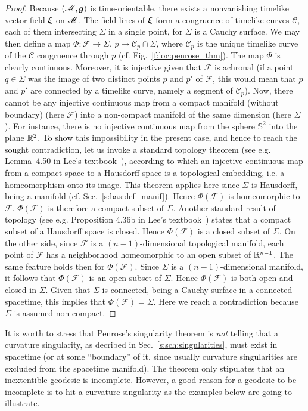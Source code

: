 \begin{proof}
Because $(\mathscr{M},\bm{g})$ is time-orientable, there exists a nonvanishing
timelike vector field $\bm{\xi}$ on $\mathscr{M}$. The field lines of $\bm{\xi}$
form a congruence of timelike curves $\mathscr{C}$, each of them intersecting
$\Sigma$ in a single point, for $\Sigma$ is a Cauchy surface.
We may then define a map $\Phi: \mathscr{F} \to \Sigma$,
$p \mapsto \mathscr{C}_p \cap \Sigma$, where $\mathscr{C}_p$ is the unique
timelike curve of the $\mathscr{C}$ congruence through $p$ (cf. Fig.~\ref{f:loc:penrose_thm}).
The map $\Phi$ is clearly continuous. Moreover, it is injective given that
$\mathscr{F}$ is achronal (if a point $q\in\Sigma$ was the image of two distinct
points $p$ and $p'$ of $\mathscr{F}$, this would mean that $p$ and $p'$
are connected by a timelike curve, namely a segment of $\mathscr{C}_p$).
Now, there cannot be any injective continuous map from a
compact manifold (without boundary) (here $\mathscr{F}$)
into a non-compact manifold of the same dimension (here $\Sigma$). For instance,
there is no injective continuous map from the sphere $\mathbb{S}^2$ into
the plane $\mathbb{R}^2$. To show this impossibility in the present case, and hence
to reach the sought contradiction, let us invoke a
standard topology theorem (see e.g. Lemma~4.50
in Lee's textbook~\cite{Lee11}), according to which an injective continuous map
from a compact space to a Hausdorff space
is a topological embedding, i.e. a homeomorphism onto its image. This theorem applies here
since $\Sigma$ is Hausdorff, being a manifold (cf. Sec.~\ref{s:bas:def_manif}).
Hence $\Phi(\mathscr{F})$ is homeomorphic to $\mathscr{F}$.
$\Phi(\mathscr{F})$ is therefore a compact subset of $\Sigma$.
Another standard result of topology (see e.g. Proposition 4.36b in Lee's textbook~\cite{Lee11})
states that a compact subset of a Hausdorff space is closed. Hence $\Phi(\mathscr{F})$
is a closed subset of $\Sigma$.
On the other side, since $\mathscr{F}$ is a $(n-1)$-dimensional topological manifold,
each point of $\mathscr{F}$
has a neighborhood homeomorphic to an open subset of $\mathbb{R}^{n-1}$. The same feature holds then for
$\Phi(\mathscr{F})$. Since $\Sigma$ is a $(n-1)$-dimensional manifold, it follows that
$\Phi(\mathscr{F})$ is an open subset of $\Sigma$. Hence $\Phi(\mathscr{F})$ is both open
and closed in $\Sigma$. Given that $\Sigma$ is connected, being a Cauchy surface in
a connected spacetime, this implies that
$\Phi(\mathscr{F}) = \Sigma$. Here we reach a contradiction because $\Sigma$
is assumed non-compact.
\end{proof}

It is worth to stress that Penrose's singularity theorem is \emph{not}
telling that a curvature singularity, as decribed in Sec.~\ref{s:sch:singularities},
must exist in spacetime (or at some ``boundary'' of it, since
usually curvature singularities are excluded from the spacetime manifold).
The theorem only stipulates that an inextentible geodesic is incomplete. However,
a good reason for a geodesic to be incomplete is to hit a curvature singularity
as the examples below are going to illustrate.

